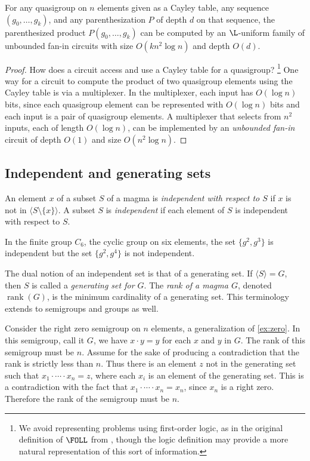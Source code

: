 \documentclass{article}
\newcommand{\gen}[1]{\langle #1 \rangle}
\DeclareMathOperator{\rank}{rank}
\begin{document}
\begin{lemma}\label{lem:product}
  For any quasigroup on $n$ elements given as a Cayley table, any sequence $(g_0, \dotsc, g_k)$, and any parenthesization $P$ of depth $d$ on that sequence, the parenthesized product $P(g_0, \dotsc, g_k)$ can be computed by an $\L$-uniform family of unbounded fan-in circuits with size $O(k n^2 \log n)$ and depth $O(d)$.
\end{lemma}
\begin{proof}
  How does a circuit access and use a Cayley table for a quasigroup?%
  \footnote{We avoid representing problems using first-order logic, as in the original definition of $\FOLL$ from \autocite{bklm01}, though the logic definition may provide a more natural representation of this sort of information.}
  One way for a circuit to compute the product of two quasigroup elements using the Cayley table is via a multiplexer.
  In the multiplexer, each input has $O(\log n)$ bits, since each quasigroup element can be represented with $O(\log n)$ bits and each input is a pair of quasigroup elements.
  A multiplexer that selects from $n^2$ inputs, each of length $O(\log n)$, can be implemented by an \emph{unbounded fan-in} circuit of depth $O(1)$ and size $O(n^2 \log n)$.
\end{proof}

\subsection{Independent and generating sets}

An element $x$ of a subset $S$ of a magma is \emph{independent with respect to $S$} if $x$ is not in $\gen{S \setminus \{x\}}$.
A subset $S$ is \emph{independent} if each element of $S$ is independent with respect to $S$.

\begin{example}
  In the finite group $C_6$, the cyclic group on six elements, the set $\{g^2, g^3\}$ is independent but the set $\{g^2, g^4\}$ is not independent.
\end{example}

The dual notion of an independent set is that of a generating set.
If $\gen{S} = G$, then $S$ is called a \emph{generating set for $G$}.
The \emph{rank of a magma $G$}, denoted $\rank(G)$, is the minimum cardinality of a generating set.
This terminology extends to semigroups and groups as well.

\begin{example}\label{ex:semigroupgen}
  Consider the right zero semigroup on $n$ elements, a generalization of \autoref{ex:zero}.
  In this semigroup, call it $G$, we have $x \cdot y = y$ for each $x$ and $y$ in $G$.
  The rank of this semigroup must be $n$.
  Assume for the sake of producing a contradiction that the rank is strictly less than $n$.
  Thus there is an element $z$ not in the generating set such that $x_1 \cdot \dotsb \cdot x_n = z$, where each $x_i$ is an element of the generating set.
  This is a contradiction with the fact that $x_1 \cdot \dotsb \cdot x_n = x_n$, since $x_n$ is a right zero.
  Therefore the rank of the semigroup must be $n$.
\end{example}
\end{document}
